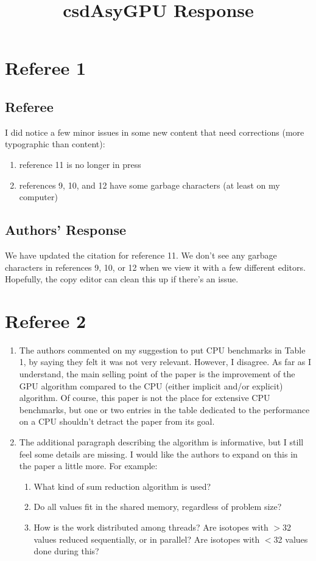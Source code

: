 \documentclass[12pt]{article}
\title{csdAsyGPU Response}
\begin{document}
\maketitle
\section*{Referee 1}
\subsection*{Referee}
I did notice a few minor issues in some new content that need corrections (more typographic than content):
\begin{enumerate}
  \item reference 11 is no longer in press
  \item references 9, 10, and 12 have some garbage characters (at least on my computer)
\end{enumerate}

\subsection*{Authors' Response}
We have updated the citation for reference 11.  We don't see any garbage characters in references 9, 10, or 12 when we view it with a few different editors.  Hopefully, the copy editor can clean this up if there's an issue.

\section*{Referee 2}
\begin{enumerate}
\item  The authors commented on my suggestion to put CPU benchmarks in Table 1, by saying they felt it was not very relevant. However, I disagree. As far as I understand, the main selling point of the paper is the improvement of the GPU algorithm compared to the CPU (either implicit and/or explicit) algorithm. Of course, this paper is not the place for extensive CPU benchmarks, but one or two entries in the table dedicated to the performance on a CPU shouldn't detract the paper from its goal.

\item  The additional paragraph describing the algorithm is informative, but I still feel some details are missing. I would like the authors to expand on this in the paper a little more. For example:
\begin{enumerate}
	\item What kind of sum reduction algorithm is used?
	\item Do all values fit in the shared memory, regardless of problem size?
	\item How is the work distributed among threads? Are isotopes with $>$32 values reduced sequentially, or in parallel? Are isotopes with $<$32 values done during this?
\end{enumerate}
\end{enumerate}
\end{document}
